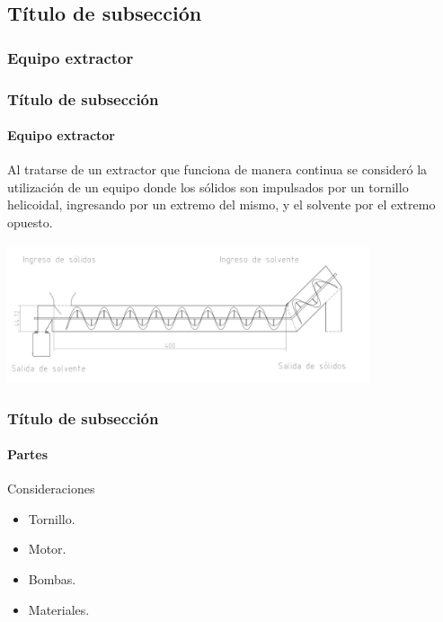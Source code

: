 \documentclass[aspectratio=1610]{beamer}
\newcommand{\ssec}{Título de subsección}
\begin{document}
\subsection{\ssec}
\subsubsection{Equipo extractor}
\begin{frame}
	\frametitle{\ssec}
	\framesubtitle{Equipo extractor}
	Al tratarse de un extractor que funciona de manera continua se consideró la utilización de
	un equipo donde los sólidos son impulsados por un tornillo helicoidal, 
	ingresando por un extremo del mismo, y el solvente por el extremo opuesto.
	\begin{center}
	\includegraphics[width=0.8\textwidth]{figs/design-extractorsl-diagrama.png}
	\end{center}

\end{frame}
\begin{frame}
	\frametitle{\ssec}
	\framesubtitle{Partes}
	\begin{block}{Consideraciones}
	\begin{itemize} 
	\item Tornillo.
	\item Motor.
	\item Bombas.
	\item Materiales.
	\end{itemize}
	\end{block}

\end{frame}
\end{document}
